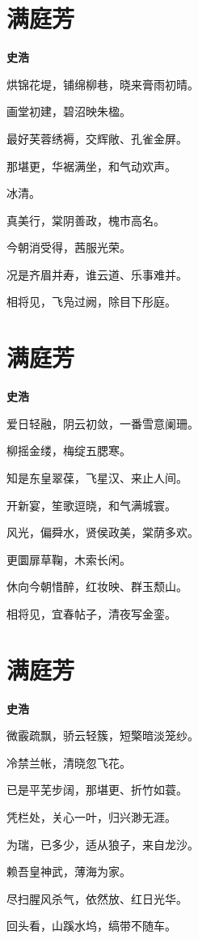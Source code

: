 \documentclass[12pt,a4paper]{ctexbook}
\begin{document}
\section{满庭芳}
\textbf{史浩}\par\vspace{0.5em}
烘锦花堤，铺绵柳巷，晓来膏雨初晴。\par
画堂初建，碧沼映朱楹。\par
最好芙蓉绣褥，交辉敞、孔雀金屏。\par
那堪更，华裾满坐，和气动欢声。\par
冰清。\par
真美行，棠阴善政，槐市高名。\par
今朝消受得，茜服光荣。\par
况是齐眉并寿，谁云道、乐事难并。\par
相将见，飞凫过阙，除目下彤庭。\par

\section{满庭芳}
\textbf{史浩}\par\vspace{0.5em}
爱日轻融，阴云初敛，一番雪意阑珊。\par
柳摇金缕，梅绽五腮寒。\par
知是东皇翠葆，飞星汉、来止人间。\par
开新宴，笙歌逗晓，和气满城寰。\par
风光，偏舜水，贤侯政美，棠荫多欢。\par
更圜扉草鞠，木索长闲。\par
休向今朝惜醉，红妆映、群玉颓山。\par
相将见，宜春帖子，清夜写金銮。\par

\section{满庭芳}
\textbf{史浩}\par\vspace{0.5em}
微霰疏飘，骄云轻簇，短檠暗淡笼纱。\par
冷禁兰帐，清晓忽飞花。\par
已是平芜步阔，那堪更、折竹如蓑。\par
凭栏处，关心一叶，归兴渺无涯。\par
为瑞，已多少，适从狼子，来自龙沙。\par
赖吾皇神武，薄海为家。\par
尽扫腥风杀气，依然放、红日光华。\par
回头看，山蹊水坞，缟带不随车。\par
\end{document}
